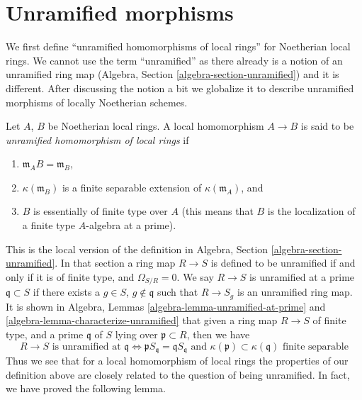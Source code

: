 \section{Unramified morphisms}
\label{section-unramified-definition}

\noindent
We first define ``unramified homomorphisms of local rings'' for Noetherian
local rings. We cannot use the term ``unramified'' as there already is
a notion of
an unramified ring map (Algebra, Section \ref{algebra-section-unramified})
and it is different. After discussing the notion a bit we
globalize it to describe unramified morphisms of locally Noetherian schemes.

\begin{definition}
\label{definition-unramified-rings}
Let $A$, $B$ be Noetherian local rings. A local homomorphism $A \to B$
is said to be {\it unramified homomorphism of local rings} if
\begin{enumerate}
\item $\mathfrak m_AB = \mathfrak m_B$,
\item $\kappa(\mathfrak m_B)$ is a finite separable extension of
$\kappa(\mathfrak m_A)$, and
\item $B$ is essentially of finite type over $A$ (this means
that $B$ is the localization of a finite type $A$-algebra at a prime).
\end{enumerate}
\end{definition}

\noindent
This is the local version of the
definition in Algebra, Section \ref{algebra-section-unramified}.
In that section a ring map $R \to S$ is defined to be unramified if and
only if it is of finite type, and $\Omega_{S/R} = 0$.
We say $R \to S$ is unramified at a prime $\mathfrak q \subset S$
if there exists a $g \in S$, $g \not \in \mathfrak q$ such that
$R \to S_g$ is an unramified ring map. It is shown in
Algebra, Lemmas \ref{algebra-lemma-unramified-at-prime} and
\ref{algebra-lemma-characterize-unramified} that given a ring
map $R \to S$ of finite type, and a prime $\mathfrak q$ of $S$
lying over $\mathfrak p \subset R$, then we have
$$
R \to S\text{ is unramified at }\mathfrak q
\Leftrightarrow
\mathfrak pS_{\mathfrak q} = \mathfrak q S_{\mathfrak q}
\text{ and }
\kappa(\mathfrak p) \subset \kappa(\mathfrak q)\text{ finite separable}
$$
Thus we see that for a local homomorphism of local rings the properties
of our definition above are closely related to the question of
being unramified. In fact, we have proved the following lemma.

